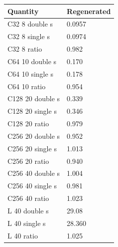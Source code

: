 \begin{tabular}{ll}
Quantity & Regenerated \\
\hline
C32 8 double s & 0.0957 \\
C32 8 single s & 0.0974 \\
C32 8 ratio & 0.982 \\
C64 10 double s & 0.170 \\
C64 10 single s & 0.178 \\
C64 10 ratio & 0.954 \\
C128 20 double s & 0.339 \\
C128 20 single s & 0.346 \\
C128 20 ratio & 0.979 \\
C256 20 double s & 0.952 \\
C256 20 single s & 1.013 \\
C256 20 ratio & 0.940 \\
C256 40 double s & 1.004 \\
C256 40 single s & 0.981 \\
C256 40 ratio & 1.023 \\
L 40 double s & 29.08 \\
L 40 single s & 28.360 \\
L 40 ratio & 1.025 \\
\end{tabular}

